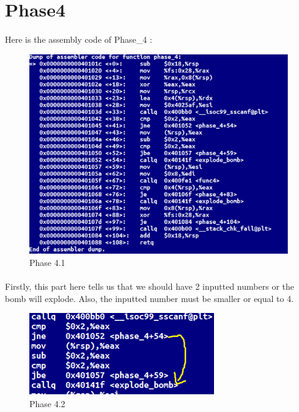 \documentclass[a4paper]{article}
\begin{document}
\section{Phase4}

\paragraph{}
Here is the assembly code of Phase\_4 : 

\begin{figure}[h!]
  \includegraphics[width=\linewidth]{bai4_1.png}
  \caption{Phase 4.1}
  \label{}
\end{figure}

\paragraph{}
Firstly, this part here tells us that we should have 2 inputted numbers or the bomb will explode. Also, the inputted number must be smaller or equal to 4.
\newpage
\begin{figure}[h!]
  \includegraphics[width=\linewidth]{bai4_2.png}
  \caption{Phase 4.2}
  \label{}
\end{figure}
\end{document}
